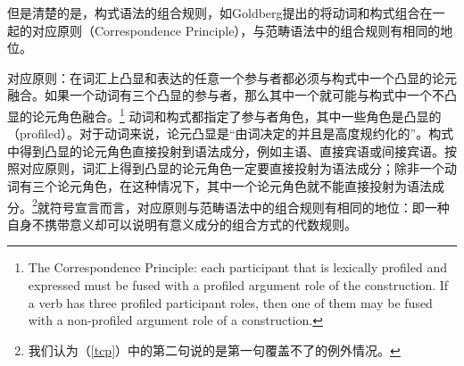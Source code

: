 但是清楚的是，构式语法的组合规则，如Goldberg提出的将动词和构式组合在一起的对应原则（Correspondence Principle）\citeyearpar[]{Goldberg95a}，与范畴语法中的组合规则有相同的地位。

\ea
对应原则：在词汇上凸显和表达的任意一个参与者都必须与构式中一个凸显的论元融合。如果一个动词有三个凸显的参与者，那么其中一个就可能与构式中一个不凸显的论元角色融合。\citep[]{Goldberg95a}\footnote{%
The Correspondence Principle:  each participant that is lexically profiled and expressed must be
fused with a profiled argument role of the construction.  If a verb has three profiled participant
roles, then one of them may be fused with a non-profiled argument role of a construction. 
}\label{tcp}
\z
动词和构式都指定了参与者角色，其中一些角色是凸显的（profiled）。对于动词来说，论元凸显是“由词决定的并且是高度规约化的”\citep[]{Goldberg95a}。构式中得到凸显的论元角色直接投射到语法成分，例如主语、直接宾语或间接宾语。按照对应原则，词汇上得到凸显的论元角色一定要直接投射为语法成分；除非一个动词有三个论元角色，在这种情况下，其中一个论元角色就不能直接投射为语法成分。\footnote{我们认为（\ref{tcp}）中的第二句说的是第一句覆盖不了的例外情况。}就符号宣言而言，对应原则与范畴语法中的组合规则有相同的地位：即一种自身不携带意义却可以说明有意义成分的组合方式的代数规则。

